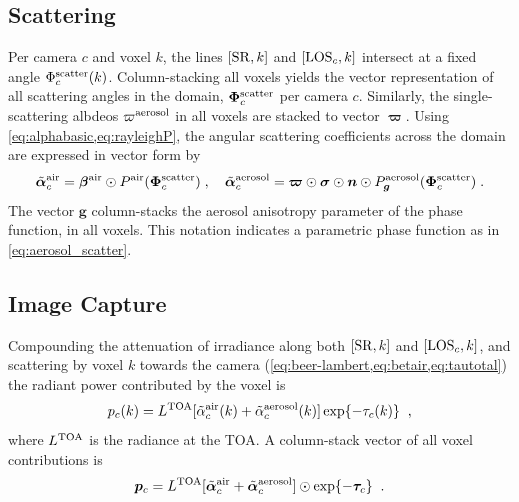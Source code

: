 \documentclass[10pt,letterpaper]{article}
\newcommand{\vect}[1]{\bm{#1}}
\begin{document}

\subsection{Scattering}
\label{sec:scattering}

Per camera $c$ and voxel $k$, the lines $[{\rm SR},k]$ and $[{\rm
  LOS}_c,k]$ intersect at a fixed angle $\Phi^{\rm scatter}_c(k)$.
Column-stacking all voxels yields the vector representation of all
scattering angles in the domain, $\vect{\Phi}^{\rm scatter}_c$ per
camera $c$. Similarly, the single-scattering albdeos $\varpi^{\rm
  aerosol}$ in all voxels are stacked to vector $\vect{\varpi}$.
Using \cref{eq:alphabasic,eq:rayleighP}, the
angular scattering coefficients across the domain are expressed in
vector form by
\begin{equation}
  \tilde{\vect{\alpha}}^{\rm air}_c =
  \vect{\beta}^{\rm air} \odot P^{\rm air}(\vect{\Phi}^{\rm scatter}_c)\;,\quad
  \tilde{\vect{\alpha}}^{\rm aerosol}_c = \vect{\varpi}\odot
  \vect{\sigma} \odot {\bm n} \odot P^{\rm aerosol}_{\bm
    g}(\vect{\Phi}^{\rm scatter}_c) \;.
  \label{eq:alpha_matrix}
\end{equation}
The vector ${\bm g}$ column-stacks the aerosol anisotropy parameter of the
phase function, in all voxels. This notation indicates a
parametric phase function as in \cref{eq:aerosol_scatter}.



\subsection{Image Capture}
\label{sec:captured-image}

Compounding the attenuation of irradiance along both $[{\rm SR},k]$
and $[{\rm LOS}_c,k]$, and scattering by voxel $k$ towards the camera
(\cref{eq:beer-lambert,eq:betair,eq:tautotal}) the radiant power
contributed by the voxel is
\begin{equation}
  p_c(k)= L^{\rm TOA}
  [\tilde{\alpha}^{\rm air}_c(k) + \tilde{\alpha}^{\rm aerosol}_c(k)]
  \exp\{-\tau_c(k)\}
  \;\;,
  \label{eq:ick}
\end{equation}
where $L^{\rm TOA}$ is the radiance at the TOA. A column-stack vector
of all voxel contributions is
\begin{equation}
  {\bm p}_c= L^{\rm TOA}
  [\tilde{\vect{\alpha}}^{\rm air}_c + \tilde{\vect{\alpha}}^{\rm aerosol}_c]
  \odot \exp\{-\vect{\tau}_c\}
  \;\;.
  \label{eq:pc}
\end{equation}
\end{document}

